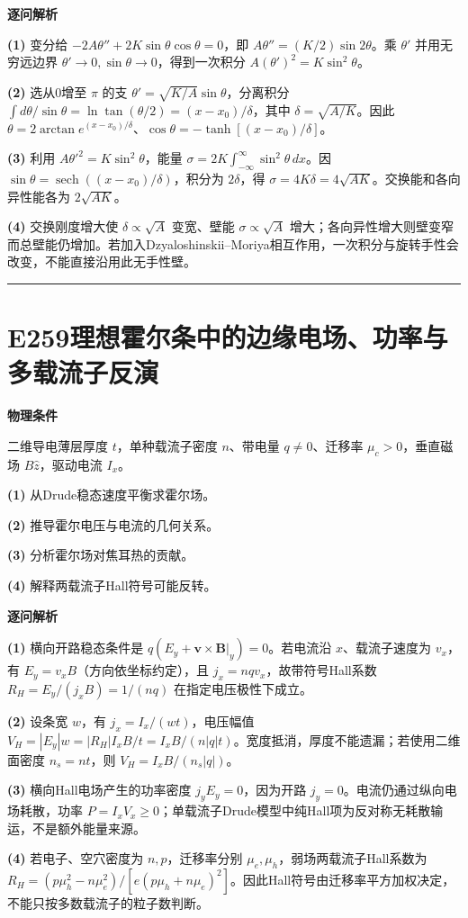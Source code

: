 \documentclass[UTF8,a4paper,11pt,oneside,openany]{ctexbook}
\begin{document}
\par\medskip\noindent\textbf{逐问解析}
\par\noindent\textbf{(1)} 变分给 \(-2A\theta''+2K\sin\theta\cos\theta=0\)，即 \(A\theta''=(K/2)\sin2\theta\)。乘 \(\theta'\) 并用无穷远边界 \(\theta'\to0,\sin\theta\to0\)，得到一次积分 \(A(\theta')^2=K\sin^2\theta\)。
\par\noindent\textbf{(2)} 选从0增至 \(\pi\) 的支 \(\theta'=\sqrt{K/A}\sin\theta\)，分离积分 \(\int d\theta/\sin\theta=\ln\tan(\theta/2)=(x-x_0)/\delta\)，其中 \(\delta=\sqrt{A/K}\)。因此 \(\theta=2\arctan e^{(x-x_0)/\delta}\)、\(\cos\theta=-\tanh[(x-x_0)/\delta]\)。
\par\noindent\textbf{(3)} 利用 \(A\theta'^2=K\sin^2\theta\)，能量 \(\sigma=2K\int_{-\infty}^\infty\sin^2\theta\,dx\)。因 \(\sin\theta=\operatorname{sech}((x-x_0)/\delta)\)，积分为 \(2\delta\)，得 \(\sigma=4K\delta=4\sqrt{AK}\)。交换能和各向异性能各为 \(2\sqrt{AK}\)。
\par\noindent\textbf{(4)} 交换刚度增大使 \(\delta\propto\sqrt A\) 变宽、壁能 \(\sigma\propto\sqrt A\) 增大；各向异性增大则壁变窄而总壁能仍增加。若加入Dzyaloshinskii–Moriya相互作用，一次积分与旋转手性会改变，不能直接沿用此无手性壁。

\par\bigskip\hrule\bigskip
\section*{E259\quad 理想霍尔条中的边缘电场、功率与多载流子反演}
\textbf{物理条件}\par 二维导电薄层厚度 \(t\)，单种载流子密度 \(n\)、带电量 \(q\ne0\)、迁移率 \(\mu_c>0\)，垂直磁场 \(B\hat z\)，驱动电流 \(I_x\)。
\par\noindent\textbf{(1)} 从Drude稳态速度平衡求霍尔场。
\par\noindent\textbf{(2)} 推导霍尔电压与电流的几何关系。
\par\noindent\textbf{(3)} 分析霍尔场对焦耳热的贡献。
\par\noindent\textbf{(4)} 解释两载流子Hall符号可能反转。

\par\medskip\noindent\textbf{逐问解析}
\par\noindent\textbf{(1)} 横向开路稳态条件是 \(q(E_y+\boldsymbol v\times\boldsymbol B|_y)=0\)。若电流沿 \(x\)、载流子速度为 \(v_x\)，有 \(E_y=v_xB\)（方向依坐标约定），且 \(j_x=nqv_x\)，故带符号Hall系数 \(R_H=E_y/(j_xB)=1/(nq)\) 在指定电压极性下成立。
\par\noindent\textbf{(2)} 设条宽 \(w\)，有 \(j_x=I_x/(wt)\)，电压幅值 \(V_H=|E_y|w=|R_H|I_xB/t=I_xB/(n|q|t)\)。宽度抵消，厚度不能遗漏；若使用二维面密度 \(n_s=nt\)，则 \(V_H=I_xB/(n_s|q|)\)。
\par\noindent\textbf{(3)} 横向Hall电场产生的功率密度 \(j_yE_y=0\)，因为开路 \(j_y=0\)。电流仍通过纵向电场耗散，功率 \(P=I_xV_x\ge0\)；单载流子Drude模型中纯Hall项为反对称无耗散输运，不是额外能量来源。
\par\noindent\textbf{(4)} 若电子、空穴密度为 \(n,p\)，迁移率分别 \(\mu_e,\mu_h\)，弱场两载流子Hall系数为 \(R_H=(p\mu_h^2-n\mu_e^2)/[e(p\mu_h+n\mu_e)^2]\)。因此Hall符号由迁移率平方加权决定，不能只按多数载流子的粒子数判断。
\end{document}
